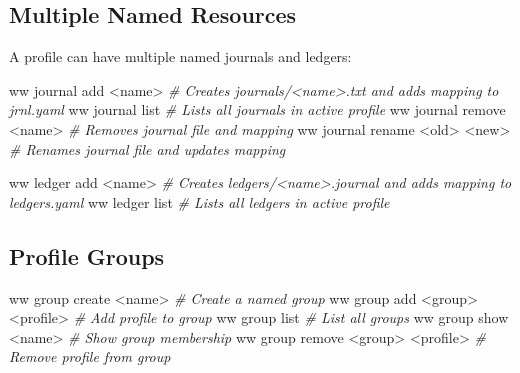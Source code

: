 \documentclass[11pt, a4paper, DIV=14]{scrartcl}
\newenvironment{Shaded}{%
  \vspace{4pt}%
  \begin{lrbox}{\ShadedBox}%
  \begin{minipage}{\dimexpr\linewidth-2\fboxsep\relax}%
  \vspace{4pt}%
}{%
  \vspace{4pt}%
  \end{minipage}%
  \end{lrbox}%
  \noindent\colorbox{CodeBg}{\usebox{\ShadedBox}}%
  \par\vspace{4pt}%
}
\newcommand{\CommentTok}[1]{\textcolor{BabbGray}{\textit{#1}}}
\newcommand{\ExtensionTok}[1]{#1}
\newcommand{\NormalTok}[1]{#1}
\newcommand{\OperatorTok}[1]{#1}
\newenvironment{Highlighting}{\ttfamily\fontsize{8.2}{11}\selectfont}{}
\begin{document}
\subsection{Multiple Named Resources}\label{multiple-named-resources}

A profile can have multiple named journals and ledgers:

\begin{Shaded}
\begin{Highlighting}[]
\ExtensionTok{ww}\NormalTok{ journal add }\OperatorTok{\textless{}}\NormalTok{name}\OperatorTok{\textgreater{}}          \CommentTok{\# Creates journals/\textless{}name\textgreater{}.txt and adds mapping to jrnl.yaml}
\ExtensionTok{ww}\NormalTok{ journal list                }\CommentTok{\# Lists all journals in active profile}
\ExtensionTok{ww}\NormalTok{ journal remove }\OperatorTok{\textless{}}\NormalTok{name}\OperatorTok{\textgreater{}}       \CommentTok{\# Removes journal file and mapping}
\ExtensionTok{ww}\NormalTok{ journal rename }\OperatorTok{\textless{}}\NormalTok{old}\OperatorTok{\textgreater{}} \OperatorTok{\textless{}}\NormalTok{new}\OperatorTok{\textgreater{}}  \CommentTok{\# Renames journal file and updates mapping}

\ExtensionTok{ww}\NormalTok{ ledger add }\OperatorTok{\textless{}}\NormalTok{name}\OperatorTok{\textgreater{}}           \CommentTok{\# Creates ledgers/\textless{}name\textgreater{}.journal and adds mapping to ledgers.yaml}
\ExtensionTok{ww}\NormalTok{ ledger list                 }\CommentTok{\# Lists all ledgers in active profile}
\end{Highlighting}
\end{Shaded}

\subsection{Profile Groups}\label{profile-groups}

\begin{Shaded}
\begin{Highlighting}[]
\ExtensionTok{ww}\NormalTok{ group create }\OperatorTok{\textless{}}\NormalTok{name}\OperatorTok{\textgreater{}}                    \CommentTok{\# Create a named group}
\ExtensionTok{ww}\NormalTok{ group add }\OperatorTok{\textless{}}\NormalTok{group}\OperatorTok{\textgreater{}} \OperatorTok{\textless{}}\NormalTok{profile}\OperatorTok{\textgreater{}}            \CommentTok{\# Add profile to group}
\ExtensionTok{ww}\NormalTok{ group list                             }\CommentTok{\# List all groups}
\ExtensionTok{ww}\NormalTok{ group show }\OperatorTok{\textless{}}\NormalTok{name}\OperatorTok{\textgreater{}}                      \CommentTok{\# Show group membership}
\ExtensionTok{ww}\NormalTok{ group remove }\OperatorTok{\textless{}}\NormalTok{group}\OperatorTok{\textgreater{}} \OperatorTok{\textless{}}\NormalTok{profile}\OperatorTok{\textgreater{}}         \CommentTok{\# Remove profile from group}
\end{Highlighting}
\end{Shaded}
\end{document}
